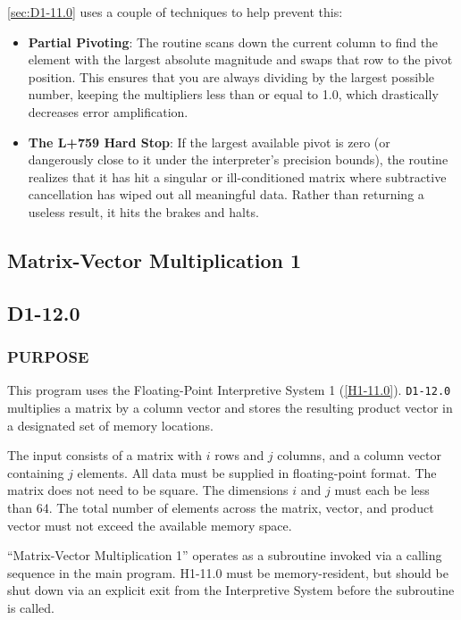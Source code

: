 \documentclass{article}
\begin{document}
\ref{sec:D1-11.0} uses a couple of techniques to help prevent this:
\begin{itemize}
	
\item \textbf{Partial Pivoting}: The routine scans down the current column to find the element with the largest absolute magnitude and swaps that row to the pivot position. This ensures that you are always dividing by the largest possible number, keeping the multipliers less than or equal to 1.0, which drastically decreases error amplification.

\item \textbf{The L+759 Hard Stop}: If the largest available pivot is zero (or dangerously close to it under the interpreter's precision bounds), the routine realizes that it has hit a singular or ill-conditioned matrix where subtractive cancellation has wiped out all meaningful data. Rather than returning a useless result, it hits the brakes and halts.
\end{itemize}
\newpage

\subsection{Matrix-Vector Multiplication 1}
\label{subsec:matrix_vector_multiplication_1}

\subsection*{D1-12.0}

\subsubsection*{PURPOSE}
This program uses the Floating-Point Interpretive System 1 (\ref{H1-11.0}). \texttt{D1-12.0} multiplies a matrix by a column vector and stores the resulting product vector in a designated set of memory locations. 

The input consists of a matrix with $i$ rows and $j$ columns, and a column vector containing $j$ elements. All data must be supplied in floating-point format. The matrix does not need to be square. The dimensions $i$ and $j$ must each be less than 64. The total number of elements across the matrix, vector, and product vector must not exceed the available memory space.

\noindent
``Matrix-Vector Multiplication 1'' operates as a subroutine invoked via a calling sequence in the main program. H1-11.0 must be memory-resident, but should be shut down via an explicit exit from the Interpretive System before the subroutine is called. 
\end{document}
